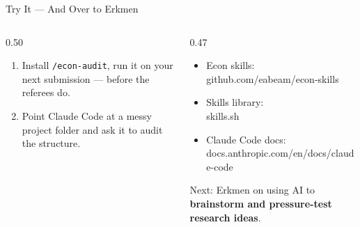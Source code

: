 \documentclass[aspectratio=169, 10pt]{beamer}
\begin{document}
\begin{frame}[fragile]{Try It --- And Over to Erkmen}
\begin{columns}[T]
\begin{column}{0.50\textwidth}
\begin{tcolorbox}[keybox, title={\faRocket\quad What to Try First}]
\small
\begin{enumerate}\setlength{\itemsep}{3pt}
  \item Install \texttt{/econ-audit}, run it on your next submission --- before the referees do.
  \item Point Claude Code at a messy project folder and ask it to audit the structure.
\end{enumerate}
\end{tcolorbox}
\vskip4pt
\end{column}
\begin{column}{0.47\textwidth}
\begin{tcolorbox}[keybox, title={\faLink\quad Resources}, top=3pt, bottom=3pt]
\small
\begin{itemize}\setlength{\itemsep}{3pt}
  \item Econ skills:\\{\scriptsize\ttfamily github.com/eabeam/econ-skills}
  \item Skills library:\\{\scriptsize\ttfamily skills.sh}
  \item Claude Code docs:\\{\scriptsize\ttfamily docs.anthropic.com/en/docs/claude-code}
\end{itemize}
\end{tcolorbox}
\vskip4pt
{\small\color{SlateTeal} Next: Erkmen on using AI to \textbf{brainstorm and pressure-test research ideas}.}
\end{column}
\end{columns}
\end{frame}
\end{document}
